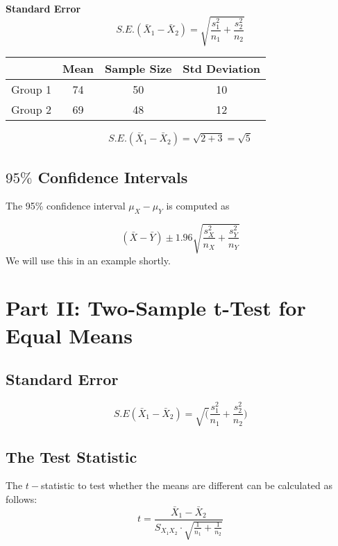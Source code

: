 \documentclass[]{report}
\begin{document}
\textbf{Standard Error}
\[ S.E.(\bar{X}_1 - \bar{X}_2) = \sqrt{\frac{s^2_1}{n_1} + \frac{s^2_2}{n_2}} \]

\begin{center}
\begin{tabular}{|c|c|c|c|}
\hline  & \phantom{spa}Mean\phantom{spa} & Sample Size & Std Deviation \\ 
\hline \phantom{spa}Group 1\phantom{spa} & 74  & 50 & 10 \\ 
\hline Group 2 & 69  & 48 & 12 \\ 
\hline 
\end{tabular} 
\end{center}

\[ S.E.(\bar{X}_1 - \bar{X}_2)  = \sqrt{2 + 3} =\sqrt{5} \]





\subsection*{$95\%$ Confidence Intervals}
The 95\% confidence interval $\mu_X - \mu_Y$ is computed as

\[ (\bar{X} - \bar{Y}) \pm 1.96 \sqrt{\frac{s^2_X}{n_X} + \frac{s^2_Y}{n_Y}}\]
We will use this in an example shortly.









\section{Part II: Two-Sample t-Test for Equal Means}



\subsection{Standard Error}




\begin{equation}
S.E(\bar{X}_{1}-\bar{X}_{2}) =
\sqrt(\frac{s^2_{1}}{n_{1}}+\frac{s^2_{2}}{n_{2}})
\end{equation}



\subsection{The Test Statistic}
The $t-$statistic to test whether the means are different can be calculated as follows:
\[
t = \frac{\bar {X}_1 - \bar{X}_2}{S_{X_1X_2} \cdot \sqrt{\frac{1}{n_1}+\frac{1}{n_2}}}
\]
\end{document}
